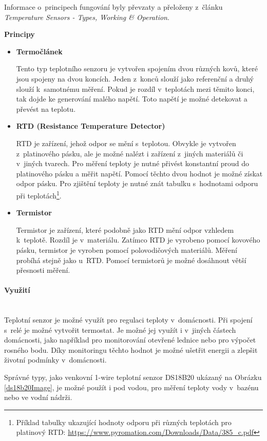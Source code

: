 Informace o~principech fungování byly převzaty a přeloženy z~článku \emph{Temperature Sensors - Types, Working \& Operation}\cite{temperature-sensor-description}.

\noindent\textbf{Principy}
\begin{itemize}
  \item \textbf{Termočlánek}
  
  Tento typ teplotního senzoru je vytvořen spojením dvou různých kovů, které jsou spojeny na dvou koncích. Jeden z~konců slouží jako referenční a druhý slouží k~samotnému měření. Pokud je rozdíl v~teplotách mezi těmito konci, tak dojde ke generování malého napětí. Toto napětí je možné detekovat a převést na teplotu.
  \item \textbf{RTD (Resistance Temperature Detector)}
  
  RTD je zařízení, jehož odpor se mění s~teplotou. Obvykle je vytvořen z~platinového pásku, ale je možné nalézt i zařízení z~jiných materiálů či v~jiných tvarech. Pro měření teploty je nutné přivést konstantní proud do platinového pásku a měřit napětí. Pomocí těchto dvou hodnot je možné získat odpor pásku. Pro zjištění teploty je nutné znát tabulku s~hodnotami odporu při teplotách\footnote{Příklad tabulky ukazující hodnoty odporu při různých teplotách pro platinový RTD: \url{https://www.pyromation.com/Downloads/Data/385\_c.pdf}}.
  \item \textbf{Termistor}
  
  Termistor je zařízení, které podobně jako RTD mění odpor vzhledem k~teplotě. Rozdíl je v~materiálu. Zatímco RTD je vyrobeno pomocí kovového pásku, termistor je vyroben pomocí polovodičových materiálů. Měření probíhá stejně jako u~RTD. Pomocí termistorů je možné dosáhnout větší přesnosti měření. 
  \end{itemize}

\paragraph*{Využití}\mbox{} \\
Teplotní senzor je možné využít pro regulaci teploty v~domácnosti. Při spojení s~relé je možné vytvořit termostat. Je možné jej využít i v~jiných částech domácnosti, jako například pro monitorování otevřené lednice nebo pro výpočet rosného bodu. Díky monitoringu těchto hodnot je možné ušetřit energii a zlepšit životní podmínky v~domácnosti.

Správné typy, jako venkovní 1-wire teplotní senzor DS18B20 ukázaný na Obrázku \ref{ds18b20Image}, je možné použít i pod vodou, pro měření teploty vody v~bazénu nebo ve vodní nádrži.

